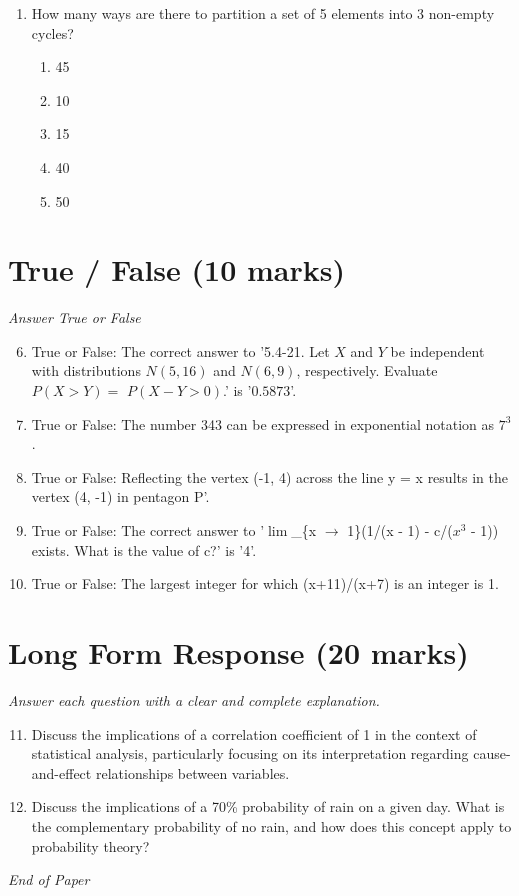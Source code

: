 \documentclass[12pt]{article}
\begin{document}
\begin{enumerate}[label=\arabic*.]
\begin{enumerate}[label=(\alph*)]
    \item 0
    \item -1
    \item 1
    \item 2
    \item -2
\end{enumerate}
\item How many ways are there to partition a set of 5 elements into 3 non-empty cycles?
\begin{enumerate}[label=(\alph*)]
    \item 45
    \item 10
    \item 15
    \item 40
    \item 50
\end{enumerate}
\end{enumerate}

\section*{True / False (10 marks)}
\textit{Answer True or False}
\begin{enumerate}[label=\arabic*.]
\setcounter{enumi}{5}
\item True or False: The correct answer to '5.4-21. Let $X$ and $Y$ be independent with distributions $N(5,16)$ and $N(6,9)$, respectively. Evaluate $P(X>Y)=$ $P(X-Y>0)$.' is '$0.5873$'.
\item True or False: The number 343 can be expressed in exponential notation as $7^3$.
\item True or False: Reflecting the vertex (-1, 4) across the line y = x results in the vertex (4, -1) in pentagon P'.
\item True or False: The correct answer to '\ensuremath{\lim}\_\{x \ensuremath{\to} 1\}(1/(x - 1) - c/($x^3$ - 1)) exists. What is the value of c?' is '4'.
\item True or False: The largest integer for which (x+11)/(x+7) is an integer is 1.
\end{enumerate}

\section*{Long Form Response (20 marks)}
\textit{Answer each question with a clear and complete explanation.}
\begin{enumerate}[label=\arabic*.]
\setcounter{enumi}{10}
\item Discuss the implications of a correlation coefficient of 1 in the context of statistical analysis, particularly focusing on its interpretation regarding cause-and-effect relationships between variables.
\item Discuss the implications of a 70\% probability of rain on a given day. What is the complementary probability of no rain, and how does this concept apply to probability theory?
\end{enumerate}

\vfill
\noindent\textit{End of Paper}
\end{document}
